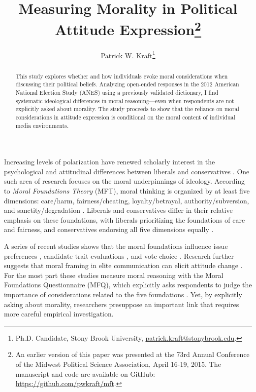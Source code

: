 \documentclass[12pt]{article}
\author{Patrick W. Kraft\footnote{Ph.D. Candidate, Stony Brook University, \href{mailto:patrick.kraft@stonybrook.edu}{patrick.kraft@stonybrook.edu}.
}}
\title{Measuring Morality in Political Attitude Expression\footnote{An earlier version of this paper was presented at the 73rd Annual Conference of the Midwest Political Science Association, April 16-19, 2015. The manuscript and code are available on GitHub: \url{https://github.com/pwkraft/mft}.}}
\begin{document}
\maketitle
\doublespacing
\thispagestyle{empty}

\begin{abstract}
This study explores whether and how individuals evoke moral considerations when discussing their political beliefs. Analyzing open-ended responses in the 2012 American National Election Study (ANES) using a previously validated dictionary, I find systematic ideological differences in moral reasoning---even when respondents are not explicitly asked about morality. The study proceeds to show that the reliance on moral considerations in attitude expression is conditional on the moral content of individual media environments.

\end{abstract}
\newpage
\setcounter{page}{1}

Increasing levels of polarization have renewed scholarly interest in the psychological and attitudinal differences between liberals and conservatives \citep{jost2006end}. One such area of research focuses on the moral underpinnings of ideology. According to \textit{Moral Foundations Theory} (MFT), moral thinking is organized by at least five dimensions: care/harm, fairness/cheating, loyalty/betrayal, authority/subversion, and sanctity/degradation \citep{graham2013moral}. Liberals and conservatives differ in their relative emphasis on these foundations, with liberals prioritizing the foundations of care and fairness, and conservatives endorsing all five dimensions equally \citep{graham2009liberals}.


A series of recent studies shows that the moral foundations influence issue preferences \citep{kertzer2014moral}, candidate trait evaluations \citep{clifford2014linking}, and vote choice \citep{iyer2010beyond}. Research further suggests that moral framing in elite communication can elicit attitude change \citep[e.g.][]{clifford2015concerns,feinberg2013moral}. For the most part these studies measure moral reasoning with the Moral Foundations Questionnaire (MFQ), which explicitly asks respondents to judge the importance of considerations related to the five foundations \citep[e.g.][]{graham2011mapping}. Yet, by explicitly asking about morality, researchers presuppose an important link that requires more careful empirical investigation.
\end{document}
